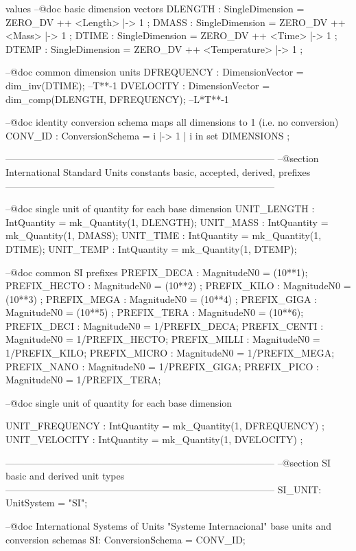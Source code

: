 \documentclass[a4paper]{article}
\begin{document}
\begin{vdm_al}
values
 --@doc basic dimension vectors
 DLENGTH   : SingleDimension = ZERO_DV ++ { <Length>      |-> 1 };
 DMASS     : SingleDimension = ZERO_DV ++ { <Mass>        |-> 1 };
 DTIME     : SingleDimension = ZERO_DV ++ { <Time>        |-> 1 };
 DTEMP     : SingleDimension = ZERO_DV ++ { <Temperature> |-> 1 };

 --@doc common dimension units
 DFREQUENCY   : DimensionVector = dim_inv(DTIME);                                          --T**-1
 DVELOCITY    : DimensionVector = dim_comp(DLENGTH, DFREQUENCY);                           --L*T**-1
        
 --@doc identity conversion schema maps all dimensions to 1 (i.e. no conversion)
 CONV_ID     : ConversionSchema = { i |-> 1 | i in set DIMENSIONS };
    
------------------------------------------------------------------------------------
--@section International Standard Units constants basic, accepted, derived, prefixes 
------------------------------------------------------------------------------------

 --@doc single unit of quantity for each base dimension  
 UNIT_LENGTH   : IntQuantity   = mk_Quantity(1, DLENGTH);
 UNIT_MASS     : IntQuantity   = mk_Quantity(1, DMASS);
 UNIT_TIME     : IntQuantity   = mk_Quantity(1, DTIME);
 UNIT_TEMP     : IntQuantity   = mk_Quantity(1, DTEMP);

 --@doc common SI prefixes
 PREFIX_DECA   : MagnitudeN0 = (10**1);
 PREFIX_HECTO  : MagnitudeN0 = (10**2)  ;
 PREFIX_KILO   : MagnitudeN0 = (10**3)  ;
 PREFIX_MEGA   : MagnitudeN0 = (10**4)  ;
 PREFIX_GIGA   : MagnitudeN0 = (10**5)  ;
 PREFIX_TERA   : MagnitudeN0 = (10**6);
 PREFIX_DECI   : MagnitudeN0 = 1/PREFIX_DECA;
 PREFIX_CENTI  : MagnitudeN0 = 1/PREFIX_HECTO;
 PREFIX_MILLI  : MagnitudeN0 = 1/PREFIX_KILO;
 PREFIX_MICRO  : MagnitudeN0 = 1/PREFIX_MEGA;
 PREFIX_NANO   : MagnitudeN0 = 1/PREFIX_GIGA;
 PREFIX_PICO   : MagnitudeN0 = 1/PREFIX_TERA;

 --@doc single unit of quantity for each base dimension  

 UNIT_FREQUENCY   : IntQuantity = mk_Quantity(1, DFREQUENCY)    ;
 UNIT_VELOCITY    : IntQuantity = mk_Quantity(1, DVELOCITY)     ;

------------------------------------------------------------------------------------
--@section SI basic and derived unit types
------------------------------------------------------------------------------------
 SI_UNIT: UnitSystem = "SI";
 
 --@doc International Systems of Units "Systeme Internacional" base units and conversion schemas
 SI: ConversionSchema = CONV_ID;


\end{vdm_al}
\end{document}
